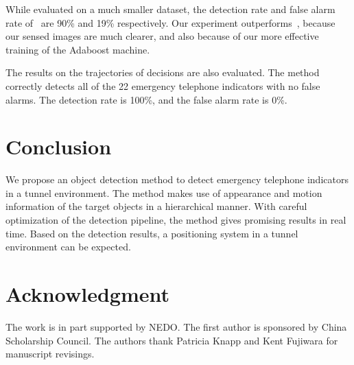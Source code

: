 \documentclass{JoITSRstyle}
\begin{document}
While evaluated on a much smaller dataset, the detection rate and false alarm rate of~\cite{wang1} are 90\% and 19\% respectively. Our experiment outperforms~\cite{wang1}, because our sensed images are much clearer, and also because of our more effective training of the Adaboost machine.

The results on the trajectories of decisions are also evaluated. The method correctly detects all of the 22 emergency telephone indicators with no false alarms. The detection rate is 100\%, and the false alarm rate is 0\%.

\section{Conclusion}
We propose an object detection method to detect emergency telephone indicators in a tunnel environment. The method makes use of appearance and motion information of the target objects in a hierarchical manner. With careful optimization of the detection pipeline, the method gives promising results in real time. Based on the detection results, a positioning system in a tunnel environment can be expected.




\section*{Acknowledgment}


The work is in part supported by NEDO. The first author is sponsored by China Scholarship Council. The authors thank Patricia Knapp and Kent Fujiwara for manuscript revisings.




{\small


}
\end{document}
